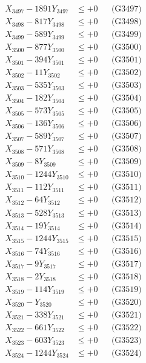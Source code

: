 \documentclass[a4paper,10pt]{article}
\begin{document}
{\begin{align}
X_{3497} - 1891Y_{3497} &\leq +0 && \text{(G3497)} \\
X_{3498} - 817Y_{3498} &\leq +0 && \text{(G3498)} \\
X_{3499} - 589Y_{3499} &\leq +0 && \text{(G3499)} \\
X_{3500} - 877Y_{3500} &\leq +0 && \text{(G3500)} \\
\allowbreak
X_{3501} - 394Y_{3501} &\leq +0 && \text{(G3501)} \\
X_{3502} - 11Y_{3502} &\leq +0 && \text{(G3502)} \\
X_{3503} - 535Y_{3503} &\leq +0 && \text{(G3503)} \\
X_{3504} - 182Y_{3504} &\leq +0 && \text{(G3504)} \\
X_{3505} - 573Y_{3505} &\leq +0 && \text{(G3505)} \\
X_{3506} - 136Y_{3506} &\leq +0 && \text{(G3506)} \\
X_{3507} - 589Y_{3507} &\leq +0 && \text{(G3507)} \\
X_{3508} - 571Y_{3508} &\leq +0 && \text{(G3508)} \\
X_{3509} - 8Y_{3509} &\leq +0 && \text{(G3509)} \\
X_{3510} - 1244Y_{3510} &\leq +0 && \text{(G3510)} \\
\allowbreak
X_{3511} - 112Y_{3511} &\leq +0 && \text{(G3511)} \\
X_{3512} - 64Y_{3512} &\leq +0 && \text{(G3512)} \\
X_{3513} - 528Y_{3513} &\leq +0 && \text{(G3513)} \\
X_{3514} - 19Y_{3514} &\leq +0 && \text{(G3514)} \\
X_{3515} - 1244Y_{3515} &\leq +0 && \text{(G3515)} \\
X_{3516} - 74Y_{3516} &\leq +0 && \text{(G3516)} \\
X_{3517} - 9Y_{3517} &\leq +0 && \text{(G3517)} \\
X_{3518} - 2Y_{3518} &\leq +0 && \text{(G3518)} \\
X_{3519} - 114Y_{3519} &\leq +0 && \text{(G3519)} \\
X_{3520} - Y_{3520} &\leq +0 && \text{(G3520)} \\
\allowbreak
X_{3521} - 338Y_{3521} &\leq +0 && \text{(G3521)} \\
X_{3522} - 661Y_{3522} &\leq +0 && \text{(G3522)} \\
X_{3523} - 603Y_{3523} &\leq +0 && \text{(G3523)} \\
X_{3524} - 1244Y_{3524} &\leq +0 && \text{(G3524)} \\

\end{align}}
\end{document}
